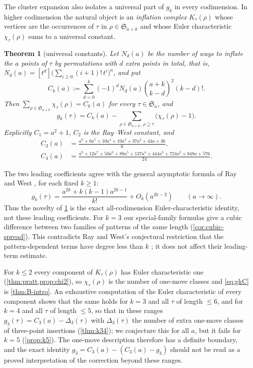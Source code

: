\documentclass[11pt,reqno]{amsart}
\theoremstyle{plain}
\newtheorem{theorem}{Theorem}[section]
\theoremstyle{definition}
\theoremstyle{remark}
\newcommand{\Sym}{\mathfrak{S}}
\begin{document}
The cluster expansion also isolates a universal part of $g_k$ in every codimension. In higher codimension the natural object is an \emph{inflation complex} $K_\tau(\rho)$ whose vertices are the occurrences of $\tau$ in $\rho\in\Sym_{a+k}$ and whose Euler characteristic $\chi_\tau(\rho)$ sums to a universal constant.

\begin{theorem}[universal constants]\label{thm:C-intro}
Let $N_d(a)$ be the number of ways to inflate the $a$ points of $\tau$ by permutations with $d$ extra points in total, that is, $N_d(a)=[t^d]\bigl(\sum_{i\ge0}(i+1)!\,t^i\bigr)^a$, and put
\begin{equation}\label{eq:Ck}
C_k(a):=\sum_{d=0}^{k}(-1)^d N_d(a)\binom{a+k}{k-d}^2(k-d)!.
\end{equation}
Then $\sum_{\rho\in\Sym_{a+k}}\chi_\tau(\rho)=C_k(a)$ for every $\tau\in\Sym_a$, and
\begin{equation}\label{eq:gkC}
g_k(\tau)=C_k(a)-\sum_{\rho\in\Sym_{a+k},\ \rho\supseteq\tau}\bigl(\chi_\tau(\rho)-1\bigr).
\end{equation}
Explicitly $C_1=a^2+1$, $C_2$ is the Ray--West constant, and
\begin{align*}
C_3(a)&=\frac{a^6+6a^5+10a^4+10a^3+37a^2+44a+36}{6},\\
C_4(a)&=\frac{a^8+12a^7+50a^6+88a^5+137a^4+444a^3+724a^2+848a+576}{24}.
\end{align*}
\end{theorem}

The two leading coefficients agree with the general asymptotic formula
of Ray and West \cite[Cor.~9.5, p.~86]{RayWest2003}, for each fixed $k\ge1$:
\[
g_k(\tau)=\frac{a^{2k}+k(k-1)a^{2k-1}}{k!}
             +O_k(a^{2k-2})\qquad(a\longrightarrow\infty).
\]
Thus the novelty of \cref{thm:C-intro} is the exact all-codimension
Euler-characteristic identity, not these leading coefficients.
For $k=3$ our special-family formulas give a cubic difference between
two families of patterns of the same length (\cref{cor:cubic-spread}).
This contradicts Ray and West's conjectural restriction that the
pattern-dependent terms have degree less than $k$
\cite[p.~57]{RayWest2003}; it does not affect their leading-term estimate.

For $k\le2$ every component of $K_\tau(\rho)$ has Euler characteristic one (\cref{thm:pratt,prop:chi2}), so $\chi_\tau(\rho)$ is the number of one-move classes and \eqref{eq:gkC} is \cref{thm:B-intro}. An exhaustive computation of the Euler characteristic of every component shows that the same holds for $k=3$ and all $\tau$ of length $\le6$, and for $k=4$ and all $\tau$ of length $\le5$, so that in these ranges $g_3(\tau)=C_3(a)-\Delta_3(\tau)$ with $\Delta_3(\tau)$ the number of extra one-move classes of three-point insertions (\cref{thm:k34}); we conjecture this for all $a$, but it fails for $k=5$ (\cref{prop:k5}). The one-move description therefore has a definite boundary, and the exact identity $g_3=C_3(a)-(C_3(a)-g_3)$ should not be read as a proved interpretation of the correction beyond these ranges.
\end{document}

